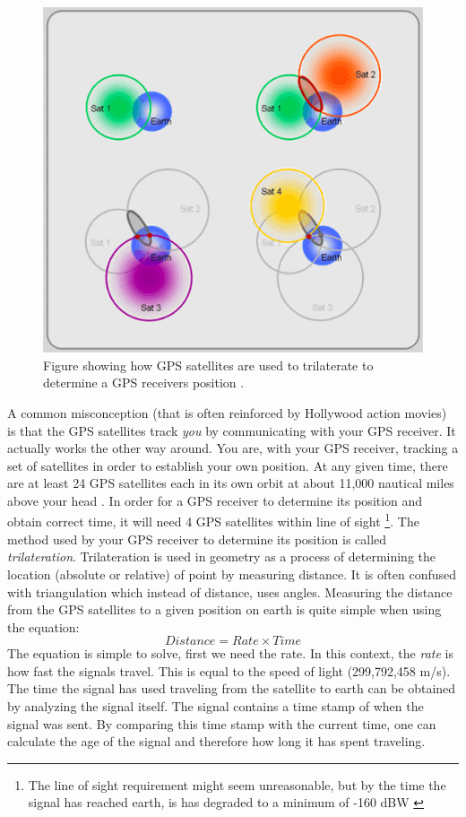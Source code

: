 \documentclass[12pt,english,a4paper]{article}
\begin{document}
\begin{figure}[hb]
  \centering
  \includegraphics[scale=0.4]{trilaterate.jpg}
  \caption[GPS trilaterate figure]
   {Figure showing how GPS satellites are used to trilaterate to determine a GPS receivers position \cite{GISTRILATERATE}.}
\end{figure}

A common misconception (that is often reinforced by Hollywood action movies) is that the GPS satellites track \textit{you} by communicating with your GPS receiver. It actually works the other way around. You are, with your GPS receiver, tracking a set of satellites in order to establish your own position. At any given time, there are at least 24 GPS satellites each in its own orbit at about 11,000 nautical miles above your head \cite{GPSGOVSS}. In order for a GPS receiver to determine its position and obtain correct time, it will need 4 GPS satellites within line of sight \footnote{The line of sight requirement might seem unreasonable, but by the time the signal has reached earth, is has degraded to a minimum of -160 dBW \cite{NATINT}}.
The method used by your GPS receiver to determine its position is called \textit{trilateration}. 
Trilateration is used in geometry as a process of determining the location (absolute or relative) of point by measuring distance. It is often confused with triangulation which instead of distance, uses angles. Measuring the distance from the GPS satellites to a given position on earth is quite simple when using the equation: 
\begin{equation} Distance = Rate \times Time \end{equation} 
The equation is simple to solve, first we need the rate. In this context, the \textit{rate} is how fast the signals travel. This is equal to the speed of light (299,792,458 m/s). The time the signal has used traveling from the satellite to earth can be obtained by analyzing the signal itself. The signal contains a time stamp of when the signal was sent. By comparing this time stamp with the current time, one can calculate the age of the signal and therefore how long it has spent traveling. \cite{GPSGOVTE} 
\end{document}
